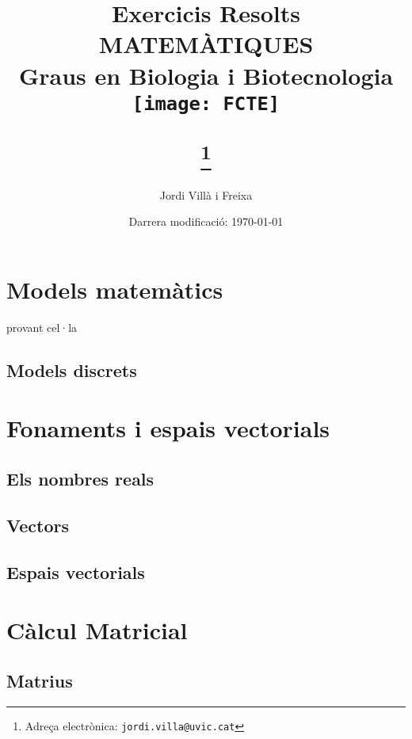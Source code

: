 \documentclass[12pt]{article}
\begin{document}
\title{Exercicis Resolts \\ \large MATEMÀTIQUES \\ Graus en Biologia i Biotecnologia \\[15pt] \texttt{[image: FCTE]}
\author{Jordi Villà i Freixa}
\thanks{Adreça electrònica: \texttt{jordi.villa@uvic.cat}}}

\date{Darrera modificació: \today}
\maketitle
\tableofcontents
\listofexercises
\newpage



\begin{ExerciseList}
    \section{Models matemàtics}
    provant cel·la
    \subsection{Models discrets}
    
\section{Fonaments i espais vectorials}
\subsection{Els nombres reals}

\subsection{Vectors}







\subsection{Espais vectorials}






\section{Càlcul Matricial}
\subsection{Matrius}
 




\end{ExerciseList}
\end{document}

